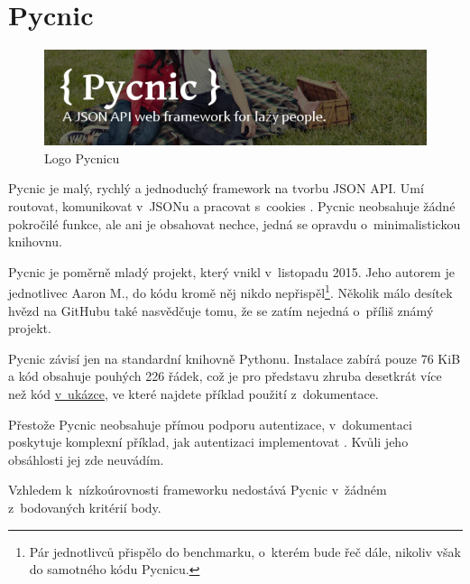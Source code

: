 \section{Pycnic}\label{pycnic}

\begin{figure}
\centering
\includegraphics{images/pycnic}
\caption{Logo Pycnicu \autocite{pycnicpic}\label{pic:pycnic}}
\end{figure}

Pycnic je malý, rychlý a jednoduchý framework na tvorbu JSON API. Umí routovat, komunikovat v~JSONu a pracovat s~cookies \autocite{pycnic}. Pycnic neobsahuje žádné pokročilé funkce, ale ani je obsahovat nechce, jedná se opravdu o~minimalistickou knihovnu.

Pycnic je poměrně mladý projekt, který vnikl v~listopadu 2015. Jeho autorem je jednotlivec Aaron M., do kódu kromě něj nikdo nepřispěl\footnote{Pár jednotlivců přispělo do benchmarku, o~kterém bude řeč dále, nikoliv však do samotného kódu Pycnicu.}. Několik málo desítek hvězd na GitHubu také nasvědčuje tomu, že se zatím nejedná o~příliš známý projekt.

Pycnic závisí jen na standardní knihovně Pythonu. Instalace zabírá pouze 76 KiB a kód obsahuje pouhých 226 řádek, což je pro představu zhruba desetkrát více než kód \protect\hyperlink{code:pycnic}{v~ukázce}, ve které najdete příklad použití z~dokumentace.

Přestože Pycnic neobsahuje přímou podporu autentizace, v~dokumentaci poskytuje komplexní příklad, jak autentizaci implementovat \autocite{pycnicauth}. Kvůli jeho obsáhlosti jej zde neuvádím.

Vzhledem k~nízkoúrovnosti frameworku nedostává Pycnic v~žádném z~bodovaných kritérií body.

